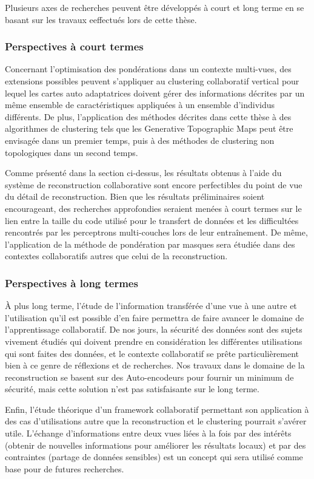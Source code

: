 Plusieurs axes de recherches peuvent être développés à court et long terme en se basant sur les travaux eeffectués lors de cette thèse. 

\subsubsection{Perspectives à court termes}

Concernant l'optimisation des pondérations dans un contexte multi-vues, des extensions possibles peuvent s'appliquer au clustering collaboratif vertical pour lequel les cartes auto adaptatrices doivent gérer des informations décrites par un même ensemble de caractéristiques appliquées à un ensemble d'individus différents. De plus, l'application des méthodes décrites dans cette thèse à des algorithmes de clustering tels que les Generative Topographic Maps peut être envisagée dans un premier temps, puis à des méthodes de clustering non topologiques dans un second temps.

Comme présenté dans la section ci-dessus, les résultats obtenus à l'aide du système de reconstruction collaborative sont encore perfectibles du point de vue du détail de reconstruction. Bien que les résultats préliminaires soient encourageant, des recherches approfondies seraient menées à court termes sur le lien entre la taille du code utilisé pour le transfert de données et les difficultées rencontrés par les perceptrons multi-couches lors de leur entraînement. De même, l'application de la méthode de pondération par masques sera étudiée dans des contextes collaboratifs autres que celui de la reconstruction.

\subsubsection{Perspectives à long termes}
À plus long terme, l'étude de l'information transférée d'une vue à une autre et l'utilisation qu'il est possible d'en faire permettra de faire avancer le domaine de l'apprentissage collaboratif. De nos jours, la sécurité des données sont des sujets vivement étudiés qui doivent prendre en considération les différentes utilisations qui sont faites des données, et le contexte collaboratif se prête particulièrement bien à ce genre de réflexions et de recherches. Nos travaux dans le domaine de la reconstruction se basent sur des Auto-encodeurs pour fournir un minimum de sécurité, mais cette solution n'est pas satisfaisante sur le long terme.

Enfin, l'étude théorique d'un framework collaboratif permettant son application à des cas d'utilisations autre que la reconstruction et le clustering pourrait s'avérer utile. L'échange d'informations entre deux vues liées à la fois par des intérêts (obtenir de nouvelles informations pour améliorer les résultats locaux) et par des contraintes (partage de données sensibles) est un concept qui sera utilisé comme base pour de futures recherches.
